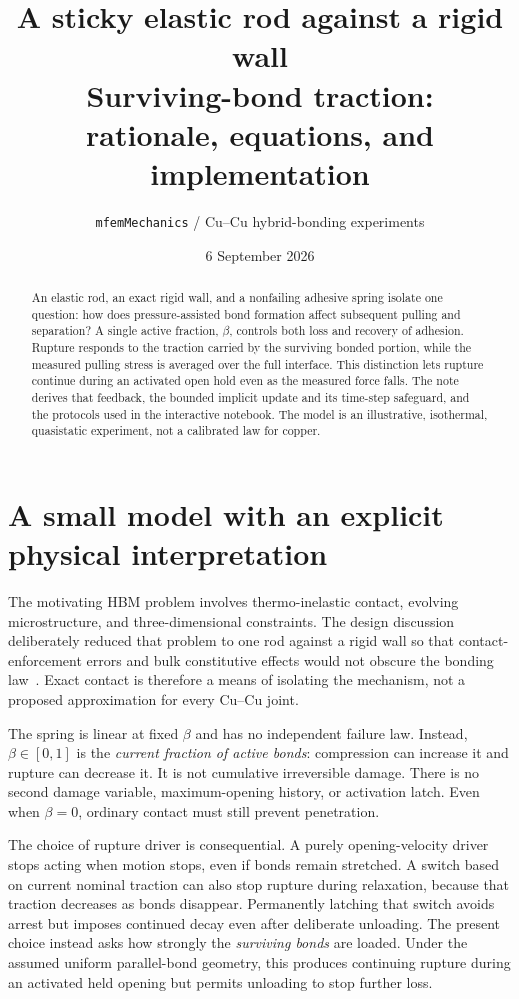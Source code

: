 \documentclass[11pt,a4paper]{article}
\title{\vspace{-1.5em}\textbf{A sticky elastic rod against a rigid wall}\\[0.4em]
  \large Surviving-bond traction:\\ rationale, equations, and implementation}
\author{\normalsize\texttt{mfemMechanics} / Cu--Cu hybrid-bonding experiments}
\date{6 September 2026}
\begin{document}
\maketitle
\thispagestyle{plain}
\begin{abstract}
An elastic rod, an exact rigid wall, and a nonfailing adhesive spring isolate
one question: how does pressure-assisted bond formation affect subsequent
pulling and separation? A single active fraction, $\beta$, controls both loss
and recovery of adhesion. Rupture responds to the traction carried by the
surviving bonded portion, while the measured pulling stress is averaged over
the full interface. This distinction lets rupture continue during an activated
open hold even as the measured force falls. The note derives that feedback,
the bounded implicit update and its time-step safeguard, and the protocols
used in the interactive notebook. The model is an illustrative, isothermal,
quasistatic experiment, not a calibrated law for copper.
\end{abstract}

\section{A small model with an explicit physical interpretation}

The motivating HBM problem involves thermo-inelastic contact, evolving
microstructure, and three-dimensional constraints. The design discussion
deliberately reduced that problem to one rod against a rigid wall so that
contact-enforcement errors and bulk constitutive effects would not obscure
the bonding law~\cite{designhistory}. Exact contact is therefore a means of
isolating the mechanism, not a proposed approximation for every Cu--Cu joint.

The spring is linear at fixed $\beta$ and has no independent failure law.
Instead, $\beta\in[0,1]$ is the \emph{current fraction of active bonds}:
compression can increase it and rupture can decrease it. It is not cumulative
irreversible damage. There is no second damage variable, maximum-opening
history, or activation latch. Even when $\beta=0$, ordinary contact must
still prevent penetration.

The choice of rupture driver is consequential. A purely opening-velocity
driver stops acting when motion stops, even if bonds remain stretched.
A switch based on current nominal traction can also stop rupture during
relaxation, because that traction decreases as bonds disappear. Permanently
latching that switch avoids arrest but imposes continued decay even after
deliberate unloading. The present choice instead asks how strongly the
\emph{surviving bonds} are loaded. Under the assumed uniform parallel-bond
geometry, this produces continuing rupture during an activated held opening
but permits unloading to stop further loss.
\end{document}
